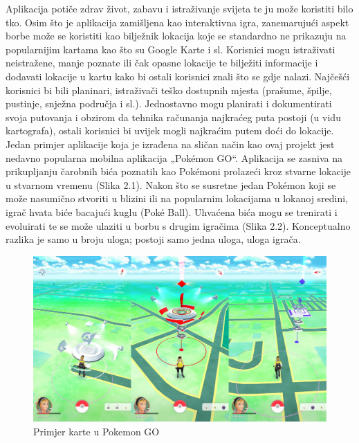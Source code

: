 Aplikacija potiče zdrav život, zabavu i istraživanje svijeta te ju može koristiti bilo tko. Osim što je aplikacija zamišljena kao interaktivna igra, zanemarujući aspekt borbe može se koristiti kao bilježnik lokacija koje se standardno ne prikazuju na popularnijim kartama kao što su Google Karte i sl. Korisnici mogu istraživati neistražene, manje poznate ili čak opasne lokacije te bilježiti informacije i dodavati lokacije u kartu kako bi ostali korisnici znali što se gdje nalazi. Najčešći korisnici bi bili planinari, istraživači teško dostupnih mjesta (prašume, špilje, pustinje, snježna područja i sl.). Jednostavno mogu planirati i dokumentirati svoja putovanja i obzirom da tehnika računanja najkraćeg puta postoji (u vidu kartografa), ostali korisnici bi uvijek mogli najkraćim putem doći do lokacije.\\

Jedan primjer aplikacije koja je izrađena na sličan način kao ovaj projekt jest nedavno popularna mobilna aplikacija „Pokémon GO“. Aplikacija se zasniva na prikupljanju čarobnih bića poznatih kao Pokémoni prolazeći kroz stvarne lokacije u stvarnom vremenu (Slika 2.1). Nakon što se susretne jedan Pokémon koji se može nasumično stvoriti u blizini ili na popularnim lokacijama u lokanoj sredini, igrač hvata biće bacajući kuglu (Poké Ball). Uhvaćena bića mogu se trenirati i evoluirati te se može ulaziti u borbu s drugim igračima (Slika 2.2). Konceptualno razlika je samo u broju uloga; postoji samo jedna uloga, uloga igrača.

			
		
		\begin{figure}[H]
			\includegraphics[width=\textwidth]{slike/Slika2.1.JPG} %
			\caption{Primjer karte u Pokemon GO}
			\label{fig:promjene1} %
		\end{figure}
		
